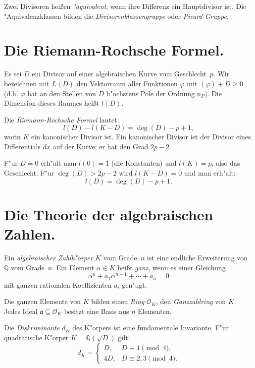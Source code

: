 \documentclass[12pt,a4paper]{article}
\theoremstyle{definition}
\begin{document}
Zwei Divisoren hei\ss{}en \emph{"aquivalent}, wenn ihre Differenz ein Hauptdivisor ist. Die "Aquivalenzklassen bilden die \emph{Divisorenklassengruppe} oder \emph{Picard-Gruppe}.

\newpage

\section{Die Riemann-Rochsche Formel.}

Es sei $D$ ein Divisor auf einer algebraischen Kurve vom Geschlecht~$p$. Wir bezeichnen mit $L(D)$ den Vektorraum aller Funktionen $\varphi$ mit $(\varphi) + D \geq 0$ (d.h. $\varphi$ hat an den Stellen von $D$ h"ochstens Pole der Ordnung $n_P$). Die Dimension dieses Raumes hei\ss{}t $l(D)$.

Die \emph{Riemann-Rochsche Formel} lautet:
\begin{equation}\tag{1}
l(D) - l(K - D) = \deg(D) - p + 1,
\end{equation}
worin $K$ ein kanonischer Divisor ist. Ein kanonischer Divisor ist der Divisor eines Differentials $dx$ auf der Kurve; er hat den Grad $2p-2$.

F"ur $D = 0$ erh"alt man $l(0) = 1$ (die Konstanten) und $l(K) = p$, also das Geschlecht. F"ur $\deg(D) > 2p-2$ wird $l(K-D) = 0$ und man erh"alt:
\begin{equation}\tag{2}
l(D) = \deg(D) - p + 1.
\end{equation}

\newpage

\section{Die Theorie der algebraischen Zahlen.}

Ein \emph{algebraischer Zahlk"orper} $K$ vom Grade~$n$ ist eine endliche Erweiterung von $\mathbb{Q}$ vom Grade~$n$. Ein Element $\alpha \in K$ hei\ss{}t \emph{ganz}, wenn es einer Gleichung
\begin{equation}\tag{1}
\alpha^n + a_1\alpha^{n-1} + \cdots + a_n = 0
\end{equation}
mit ganzen rationalen Koeffizienten $a_i$ gen"ugt.

Die ganzen Elemente von $K$ bilden einen \emph{Ring} $\mathcal{O}_K$, den \emph{Ganzzahlring} von $K$. Jedes Ideal $\mathfrak{a} \subseteq \mathcal{O}_K$ besitzt eine Basis aus $n$ Elementen.

Die \emph{Diskriminante} $d_K$ des K"orpers ist eine fundamentale Invariante. F"ur quadratische K"orper $K = \mathbb{Q}(\sqrt{D})$ gilt:
\begin{equation}\tag{2}
d_K = \begin{cases} D, & D \equiv 1 \pmod{4},\\ 4D, & D \equiv 2,3 \pmod{4}. \end{cases}
\end{equation}
\end{document}
